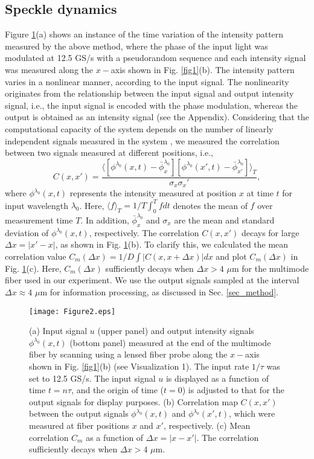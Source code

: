 \documentclass{article}
\begin{document}
\subsection{Speckle dynamics}
Figure \ref{fig2}(a) shows an instance of the time variation of the
intensity pattern measured by the above method, where the phase of the
input light was modulated at 12.5 GS/s with a pseudorandom
sequence
and each intensity signal was measured along the $x-$axis shown in
Fig. \ref{fig1}(b).
%
The intensity pattern varies in a nonlinear manner, according to
the input signal. 
%
The nonlinearity originates from the relationship between the input signal
and output intensity signal, i.e., the input signal is encoded with 
the phase modulation, whereas the output is obtained as an intensity
signal (see the Appendix). 
%
Considering that the computational capacity of the system depends on 
the number of linearly independent signals measured in the system
\cite{Dambre2012}, 
%
we measured the
correlation between two signals measured at different positions, i.e.,
\begin{equation}
C(x,x')=\dfrac{
\langle [\phi^{\lambda_0}(x,t)-\bar{\phi}^{\lambda_0}_x]
[\phi^{\lambda_0}(x',t)-\bar{\phi}^{\lambda_0}_{x'}]
\rangle_T
}
{
\sigma_x\sigma_x'},
\end{equation} 
where $\phi^{\lambda_0}(x,t)$ represents the intensity measured at
position $x$ at time $t$ for input wavelength $\lambda_0$.
%
Here, $\langle f \rangle_T = 1/T \int^T_0 f dt$ denotes 
the mean of $f$ over measurement time $T$.
%
In addition, $\bar{\phi}_x^{\lambda_0}$ and $\sigma_x$ are the mean and standard
deviation of $\phi^{\lambda_0}(x,t)$, respectively.   
%
The correlation $C(x,x')$ decays for large $\Delta x =|x'-x|$, as
shown in Fig. \ref{fig2}(b).  
%
To clarify this, we calculated the mean correlation value
$C_m(\Delta x) = 1/D\int |C(x,x+\Delta x)| dx$ and
plot $C_m(\Delta x)$ in Fig. \ref{fig2}(c). 
%
Here, $C_m(\Delta x)$ sufficiently decays when $\Delta x > 4$ $\mu$m for the multimode 
fiber used in our experiment. 
%
We use the output signals sampled at the interval 
$\Delta x \approx 4$ $\mu$m for information processing, as discussed in
Sec. \ref{sec_method}. 
% 
%
\begin{figure}[htbp]
\centering\texttt{[image: Figure2.eps]}
\caption{\label{fig2}
(a) Input signal $u$ (upper panel) and output intensity
 signals $\phi^{\lambda_0}(x,t)$ (bottom panel)
 measured at the end of the multimode fiber by scanning using a lensed
 fiber probe along the $x-$axis shown in Fig. \ref{fig1}(b) 
(see Visualization 1).
%
The input rate $1/\tau$ was set to 12.5 GS/s.
%
The input signal $u$ is displayed as a function of time $t = n\tau$, and the origin of
 time ($t = 0$) is adjusted to that for the output signals for display purposes. 
%
(b) Correlation map $C(x,x')$ between the output signals
 $\phi^{\lambda_0}(x,t)$ and $\phi^{\lambda_0}(x',t)$, which were
 measured at fiber positions $x$ and $x'$, respectively. 
%
(c) Mean correlation $C_m$ as a function of $\Delta x = |x-x'|$. 
%
The correlation sufficiently decays when $\Delta x > 4$ $\mu$m.  
%
}
\end{figure}
%
\end{document}
